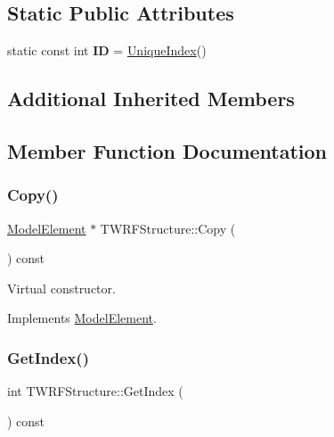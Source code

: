 \subsection*{Static Public Attributes}
\begin{DoxyCompactItemize}
\item 
\mbox{\label{classTWRFStructure_ae85f3a2715b5ee3ee020a4759dd1249b}} 
static const int {\bfseries ID} = \hyperlink{classAcceleratorComponent_aa7ad4d39e1a488b705983842ed1ac784}{Unique\+Index}()
\end{DoxyCompactItemize}
\subsection*{Additional Inherited Members}


\subsection{Member Function Documentation}
\mbox{\label{classTWRFStructure_a46eda3c195425b6cc0dc6377e08a9df9}} 
\subsubsection{\texorpdfstring{Copy()}{Copy()}}
{\footnotesize\ttfamily \hyperlink{classModelElement}{Model\+Element} $\ast$ T\+W\+R\+F\+Structure\+::\+Copy (\begin{DoxyParamCaption}{ }\end{DoxyParamCaption}) const\hspace{0.3cm}{\ttfamily [virtual]}}

Virtual constructor. 

Implements \hyperlink{classModelElement_ac3ca26d649bd86a0f31a58ae09941429}{Model\+Element}.

\mbox{\label{classTWRFStructure_a5a8ac2ad58e94158e840c5d296fbb53c}} 
\subsubsection{\texorpdfstring{Get\+Index()}{GetIndex()}}
{\footnotesize\ttfamily int T\+W\+R\+F\+Structure\+::\+Get\+Index (\begin{DoxyParamCaption}{ }\end{DoxyParamCaption}) const\hspace{0.3cm}{\ttfamily [virtual]}}

